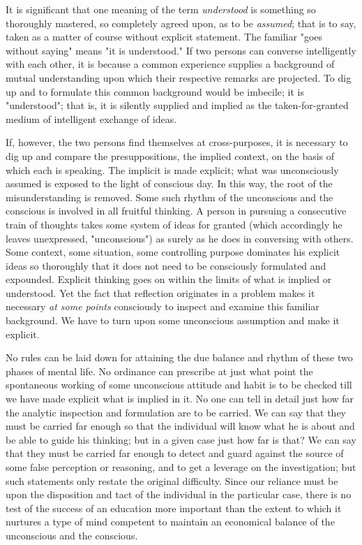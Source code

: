 \documentclass[letterpaper]{book}
\begin{document}

It is significant that one meaning of the term \emph{understood} is
something so thoroughly mastered, so completely agreed upon, as to be
\emph{assumed}; that is to say, taken as a matter of course without
explicit statement. The familiar "goes without saying" means "it is
understood." If two persons can converse intelligently with each other,
it is because a common experience supplies a background of mutual
understanding upon which their respective remarks are projected. To dig
up and to formulate this common background would be imbecile; it is
"understood"; that is, it is silently supplied and implied as the
taken-for-granted medium of intelligent exchange of ideas.


If, however, the two persons find themselves at cross-purposes, it is
necessary to dig up and compare the presuppositions, the implied
context, on the basis of which each is speaking. The implicit is made
explicit; what was unconsciously assumed is exposed to the light of
conscious day. In this way, the root of the
misunderstanding
is removed. Some such rhythm of the unconscious and the conscious is
involved in all fruitful thinking. A person in pursuing a consecutive
train of thoughts takes some system of ideas for granted (which
accordingly he leaves unexpressed, "unconscious") as surely as he does
in conversing with others. Some context, some situation, some
controlling purpose dominates his explicit ideas so thoroughly that it
does not need to be consciously formulated and expounded. Explicit
thinking goes on within the limits of what is implied or understood. Yet
the fact that reflection originates in a problem makes it necessary
\emph{at some points} consciously to inspect and examine this familiar
background. We have to turn upon some unconscious assumption and make it
explicit.


No rules can be laid down for attaining the due balance and rhythm of
these two phases of mental life. No ordinance can prescribe at just what
point the spontaneous working of some unconscious attitude and habit is
to be checked till we have made explicit what is implied in it. No one
can tell in detail just how far the analytic inspection and formulation
are to be carried. We can say that they must be carried far enough so
that the individual will know what he is about and be able to guide his
thinking; but in a given case just how far is that? We can say that they
must be carried far enough to detect and guard against the source of
some false perception or reasoning, and to get a leverage on the
investigation; but such statements only restate the original difficulty.
Since our reliance must be upon the disposition and tact of the
individual in the particular case, there is no test of the success of an
education more important than the extent to which it nurtures a type of
mind competent
to
maintain an economical balance of the unconscious and the conscious.
\end{document}
